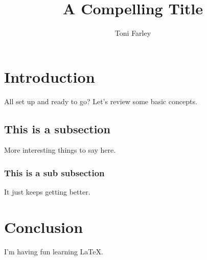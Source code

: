 \documentclass{article}
\title{A Compelling Title}
\author{Toni Farley}
\begin{document}
\maketitle

\section{Introduction}

All set up and ready to go? Let's review some basic concepts.

\subsection{This is a subsection}

More interesting things to say here.

\subsubsection{This is a sub subsection}

It just keeps getting better.

\section{Conclusion}

I'm having fun learning \LaTeX.
\end{document}
